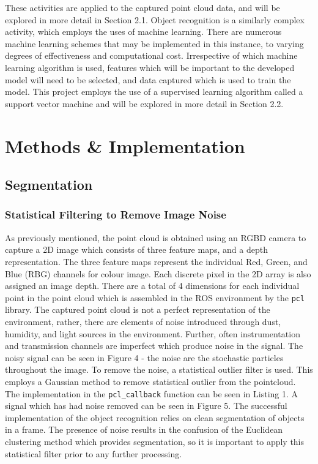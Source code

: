 \documentclass[a4paper]{article}
\begin{document}
These activities are applied to the captured point cloud data, and will be explored in more detail in Section 2.1. Object recognition is a similarly complex activity, which employs the uses of machine learning. There are numerous machine learning schemes that may be implemented in this instance, to varying degrees of effectiveness and computational cost. Irrespective of which machine learning algorithm is used, features which will be important to the developed model will need to be selected, and data captured which is used to train the model. This project employs the use of a supervised learning algorithm called a support vector machine and will be explored in more detail in Section 2.2.

\newpage

\section{Methods \& Implementation}
\subsection{Segmentation}
\subsubsection{Statistical Filtering to Remove Image Noise}
As previously mentioned, the point cloud is obtained using an RGBD camera to capture a 2D image which consists of three feature maps, and a depth representation. The three feature maps represent the individual Red, Green, and Blue (RBG) channels for colour image. Each discrete pixel in the 2D array is also assigned an image depth. There are a total of 4 dimensions for each individual point in the point cloud which is assembled in the ROS environment by the \verb|pcl| library. The captured point cloud is not a perfect representation of the environment, rather, there are elements of noise introduced through dust, humidity, and light sources in the environment. Further, often instrumentation and transmission channels are imperfect which produce noise in the signal. The noisy signal can be seen in Figure 4 - the noise are the stochastic particles throughout the image. To remove the noise, a statistical outlier filter is used. This employs a Gaussian method to remove statistical outlier from the pointcloud. The implementation in the \verb|pcl_callback| function can be seen in Listing 1. A signal which has had noise removed can be seen in Figure 5. The successful implementation of the object recognition relies on clean segmentation of objects in a frame. The presence of noise results in the confusion of the Euclidean clustering method which provides segmentation, so it is important to apply this statistical filter prior to any further processing.
\end{document}
